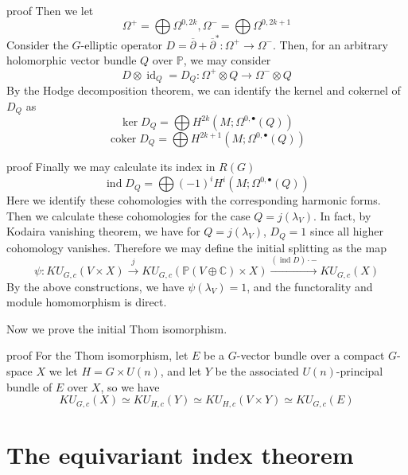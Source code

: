 \documentclass{beamer}
\DeclareMathOperator{\coker}{\mathrm{coker}}
\DeclareMathOperator{\id}{\mathrm{id}}
\DeclareMathOperator{\ind}{\mathrm{ind}}
\begin{document}
\begin{frame}
	\begin{block}{proof}
		Then we let 
		\[ \Omega^+=\bigoplus\Omega^{0,2k}, \Omega^-=\bigoplus\Omega^{0,2k+1} \]
		Consider the $G$-elliptic operator $D=\overline{\partial}+\overline{\partial}^*:\Omega^+\to\Omega^-$. Then, for an arbitrary holomorphic vector bundle $Q$ over $\mathbb{P}$, we may consider 
		\[ D\otimes\id_Q=D_Q:\Omega^+\otimes Q\to\Omega^-\otimes Q \]
		By the Hodge decomposition theorem, we can identify the kernel and cokernel of $D_Q$ as 
		\[ \ker D_Q=\bigoplus H^{2k}(M;\Omega^{0,\bullet}(Q)) \]
		\[ \coker D_Q=\bigoplus H^{2k+1}(M;\Omega^{0,\bullet}(Q)) \]
	\end{block}
\end{frame}

\begin{frame}
	\begin{block}{proof}
		Finally we may calculate its index in $R(G)$ 
		\[ \ind D_Q=\bigoplus(-1)^iH^i(M;\Omega^{0,\bullet}(Q)) \]
		Here we identify these cohomologies with the corresponding harmonic forms. 
		Then we calculate these cohomologies for the case $Q=j(\lambda_V)$. In fact, by Kodaira vanishing theorem, we have for $Q=j(\lambda_V)$, $D_Q=1$ since all higher cohomology vanishes. Therefore we may define the initial splitting as the map 
		\[ \psi:KU_{G,c}(V\times X)\xrightarrow{j}KU_{G,c}(\mathbb{P}(V\oplus\mathbb{C})\times X)\xrightarrow{(\ind D)\cdot-}KU_{G,c}(X) \]
		By the above constructions, we have $\psi(\lambda_V)=1$, and the functorality and module homomorphism is direct. 
	\end{block}
\end{frame}

\begin{frame}
	Now we prove the initial Thom isomorphism. 
	\begin{block}{proof}
		For the Thom isomorphism, let $E$ be a $G$-vector bundle over a compact $G$-space $X$ we let $H=G\times U(n)$, and let $Y$ be the associated $U(n)$-principal bundle of $E$ over $X$, so we have 
		\[ KU_{G,c}(X)\simeq KU_{H,c}(Y)\simeq KU_{H,c}(V\times Y)\simeq KU_{G,c}(E) \]
	\end{block}
\end{frame}

\section{The equivariant index theorem}
\end{document}
